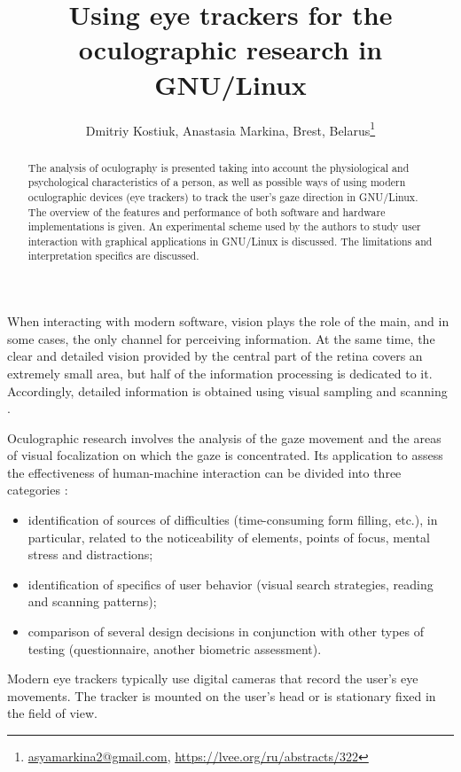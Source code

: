 \documentclass[10pt, a5paper]{article}
\begin{document}
\title{Using eye trackers for the oculographic research in GNU/Linux}
\author{Dmitriy Kostiuk, Anastasia Markina, Brest, Belarus\footnote{\url{asyamarkina2@gmail.com}, \url {https://lvee.org/ru/abstracts/322}}}
\maketitle
\begin{abstract}
The analysis of oculography is presented taking into account the physiological and psychological characteristics of a person, as well as possible ways of using modern oculographic devices (eye trackers) to track the user's gaze direction in GNU/Linux. The overview of the features and performance of both software and hardware implementations is given. An experimental scheme used by the authors to study user interaction with graphical applications in GNU/Linux is discussed. The limitations and interpretation specifics are discussed.
\end{abstract}
When interacting with modern software, vision plays the role of the main, and in some cases, the only channel for perceiving information. At the same time, the clear and detailed vision provided by the central part of the retina covers an extremely small area, but half of the information processing is dedicated to it. Accordingly, detailed information is \linebreak obtained using visual sampling and scanning \cite{bib1}.

Oculographic research involves the analysis of the gaze movement and the areas of visual focalization on which the gaze is concentrated. Its application to assess the effectiveness of human-machine interaction can be divided into three categories \cite{bib2}:

\begin{itemize}
  \item identification of sources of difficulties (time-consuming form filling, etc.), in particular, related to the noticeability of elements, points of focus, mental stress and distractions;
  \item identification of specifics of user behavior (visual search strategies, reading and scanning patterns);
  \item comparison of several design decisions in conjunction with other types of testing (questionnaire, another biometric assessment).
\end{itemize}

Modern eye trackers typically use digital cameras that record the user's eye movements. The tracker is mounted on the user's head or is stationary fixed in the field of view.
\end{document}

